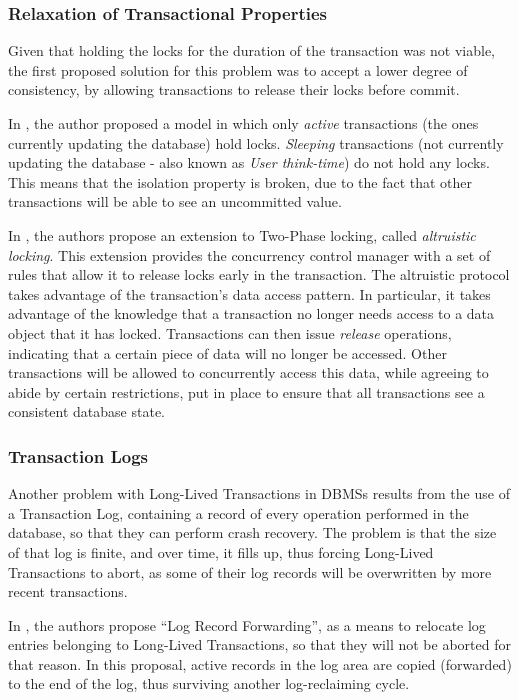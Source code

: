 \documentclass{llncs}
\begin{document}
\subsubsection{Relaxation of Transactional Properties}

Given that holding the locks for the duration of the transaction was
not viable, the first proposed solution for this problem was to accept
a lower degree of consistency, by allowing transactions to release
their locks before commit.

In \cite{gray1981transaction}, the author proposed a model in which
only {\it active} transactions (the ones currently updating the
database) hold locks. {\it Sleeping} transactions (not currently
updating the database - also known as {\it User think-time}) do not
hold any locks. This means that the isolation property is broken, due
to the fact that other transactions will be able to see an uncommitted
value.

In \cite{salem1989altruistic}, the authors propose an extension to
Two-Phase locking, called {\it altruistic locking}. This extension
provides the concurrency control manager with a set of rules that
allow it to release locks early in the transaction. The altruistic
protocol takes advantage of the transaction's data access pattern. In
particular, it takes advantage of the knowledge that a transaction no
longer needs access to a data object that it has locked. Transactions
can then issue {\it release} operations, indicating that a certain
piece of data will no longer be accessed. Other transactions will be
allowed to concurrently access this data, while agreeing to abide by
certain restrictions, put in place to ensure that all transactions see
a consistent database state.

\subsubsection{Transaction Logs}

Another problem with Long-Lived Transactions in DBMSs results from the
use of a Transaction Log, containing a record of every operation
performed in the database, so that they can perform crash
recovery. The problem is that the size of that log is finite, and over
time, it fills up, thus forcing Long-Lived Transactions to abort, as
some of their log records will be overwritten by more recent
transactions.

In \cite{hagmann1991implementing}, the authors propose ``Log Record
Forwarding'', as a means to relocate log entries belonging to
Long-Lived Transactions, so that they will not be aborted for that
reason. In this proposal, active records in the log area are copied
(forwarded) to the end of the log, thus surviving another
log-reclaiming cycle.
\end{document}
